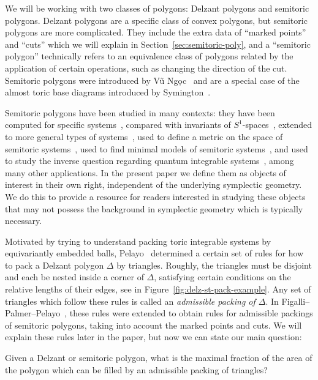 \documentclass[pdftex]{sigma}
\numberwithin{equation}{section}
\begin{document}
We will be working with two classes of polygons: Delzant polygons and semitoric polygons. Delzant polygons are a specific class of convex polygons, but semitoric polygons are more complicated. They include the extra data of ``marked points'' and ``cuts'' which we will explain in Section~\ref{sec:semitoric-poly},
and a ``semitoric polygon'' technically refers to an equivalence class of polygons related by the application of certain operations, such as changing the direction of the cut.
Semitoric polygons were introduced by V\~{u} Ng\d{o}c~\cite{VN2007} and are a special case of the almost toric base diagrams introduced by Symington~\cite{Sy2003}.

Semitoric polygons have been studied in many contexts: they have been computed for specific systems~\cite{ADH-momenta,HohMeu,HoPa2017,LFPal, LFP}, compared with invariants of $S^1$-spaces~\cite{HP-extend, HSS2015}, extended to more general types of systems~\cite{PPT-nonsimple, PeRaVN2015},
used to define a metric on the space of semitoric systems~\cite{PaSTMetric2015},
used to find minimal models of semitoric systems~\cite{KPP2015,KPP2018}, and used to study the inverse question regarding quantum integrable systems~\cite{LFPeVN2016,LFVN2021}, among many other applications.
In the present paper we define them as objects of interest in their own right, independent of the underlying symplectic geometry. We do this to provide a resource for readers interested in studying these objects that may not possess the background in symplectic geometry which is typically necessary.

Motivated by trying to understand packing toric integrable systems by equivariantly embedded balls, Pelayo~\cite{Pe2006, Pe2007} determined a certain set of rules for how to pack a Delzant polygon $\Delta$ by triangles.
Roughly, the triangles must be disjoint and each be nested inside a corner of $\Delta$, satisfying certain conditions on the relative lengths of their edges, see in Figure~\ref{fig:delz-st-pack-example}.
Any set of triangles which follow
these rules is called
an \emph{admissible packing of $\Delta$}.
In Figalli--Palmer--Pelayo~\cite{FiPaPe2016}, these rules were extended to obtain rules for admissible packings of semitoric polygons, taking into account the marked points and cuts.
We will explain these rules later in the paper, but now we can state our main question:

\begin{Question}
 Given a Delzant or semitoric polygon, what is the maximal fraction of the area of the polygon which can be filled by an admissible packing of triangles?
\end{Question}
\end{document}
